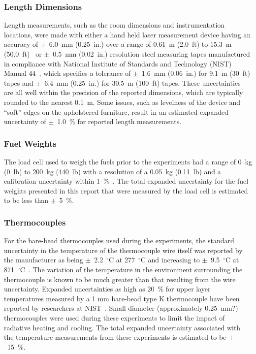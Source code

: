 \documentclass[12pt,oneside]{book}
\begin{document}
\subsubsection*{Length Dimensions}
Length measurements, such as the room dimensions and instrumentation locations, were made with either a hand held laser measurement device having an accuracy of $\pm$~6.0~mm (0.25~in.) over a range of 0.61~m (2.0~ft) to 15.3~m (50.0~ft)~\cite{StanleyTools} or $\pm$~0.5~mm (0.02~in.) resolution steel measuring tapes manufactured in compliance with National Institute of Standards and Technology (NIST) Manual 44~\cite{Butcher:2012}, which specifies a tolerance of $\pm$~1.6~mm (0.06~in.) for 9.1~m (30~ft) tapes and $\pm$~6.4~mm (0.25~in.) for 30.5~m (100~ft) tapes. These uncertainties are all well within the precision of the reported dimensions, which are typically rounded to the nearest 0.1~m. Some issues, such as levelness of the device and ``soft'' edges on the upholstered furniture, result in an estimated expanded uncertainty of $\pm$~1.0~\% for reported length measurements.

\subsubsection*{Fuel Weights}
The load cell used to weigh the fuels prior to the experiments had a range of 0~kg (0~lb) to 200~kg (440~lb) with a resolution of a 0.05~kg (0.11~lb) and a calibration uncertainty within 1~\%~\cite{Ohaus:2000}. The total expanded uncertainty for the fuel weights presented in this report that were measured by the load cell is estimated to be less than $\pm$~5~\%.

\subsubsection*{Thermocouples}
For the bare-bead thermocouples used during the experiments, the standard uncertainty in the temperature of the thermocouple wire itself was reported by the manufacturer as being $\pm$~2.2~$^{\circ}$C at 277~$^{\circ}$C and increasing to $\pm$~9.5~$^{\circ}$C at 871~$^{\circ}$C~\cite{Omega:2004}. The variation of the temperature in the environment surrounding the thermocouple is known to be much greater than that resulting from the wire uncertainty. Expanded uncertainties as high as 20~\% for upper layer temperatures measured by a 1 mm bare-bead type K thermocouple have been reported by researchers at NIST~\cite{Blevins:1999,Pitts:2003}. Small diameter (approximately 0.25~mm?) thermocouples were used during these experiments to limit the impact of radiative heating and cooling. The total expanded uncertainty associated with the temperature measurements from these experiments is estimated to be $\pm$~15~\%.
\end{document}
